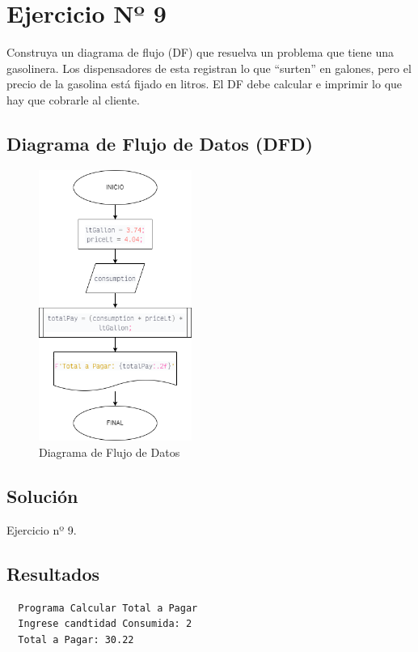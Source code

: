 \section{Ejercicio Nº 9}
Construya un diagrama de flujo (DF) que resuelva un problema que tiene una
gasolinera. Los dispensadores de esta registran lo que “surten” en galones,
pero el precio de la gasolina está fijado en litros. El DF debe calcular e
imprimir lo que hay que cobrarle al cliente.
\subsection{Diagrama de Flujo de Datos (DFD)}
\begin{figure}[H]
	\centering
	\includegraphics[width=5cm]{Images/ex9.png}
	\caption{Diagrama de Flujo de Datos}\label{fig:fg3}
\end{figure}
\subsection{Solución}
\begin{longlisting}
	\caption{Ejercicio nº 9.}\label{cod:ex_9}
\end{longlisting}
\subsection{Resultados}
\begin{verbatim}
  Programa Calcular Total a Pagar
  Ingrese candtidad Consumida: 2
  Total a Pagar: 30.22
\end{verbatim}
